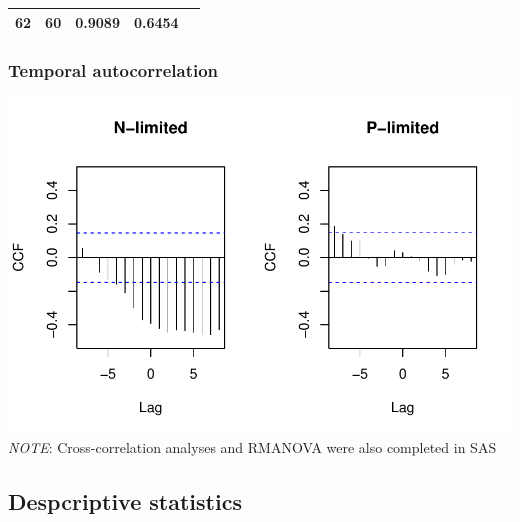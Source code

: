 \documentclass[]{article}
\begin{document}
\begin{longtable}[]{@{}ccccc@{}}
\begin{minipage}[t]{0.10\columnwidth}
62\strut
\end{minipage} & \begin{minipage}[t]{0.10\columnwidth}\centering\strut
60\strut
\end{minipage} & \begin{minipage}[t]{0.12\columnwidth}\centering\strut
0.9089\strut
\end{minipage} & \begin{minipage}[t]{0.12\columnwidth}\centering\strut
0.6454\strut
\end{minipage}\tabularnewline
\bottomrule
\end{longtable}

\newpage

\subsubsection{Temporal autocorrelation}\label{temporal-autocorrelation}

\includegraphics{analysis_ecoevostoich_files/figure-latex/unnamed-chunk-12-1.pdf}
\emph{NOTE}: Cross-correlation analyses and RMANOVA were also completed
in SAS

\newpage

\subsection{Despcriptive statistics}\label{despcriptive-statistics}
\end{document}
